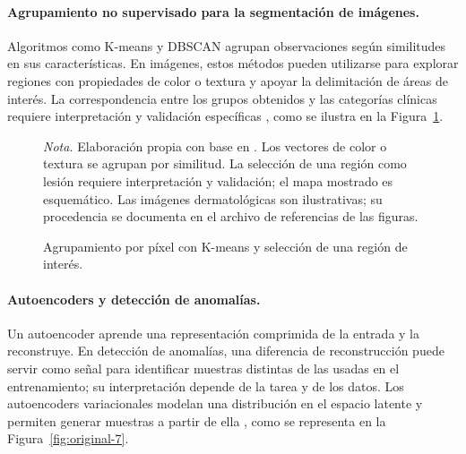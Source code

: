 \paragraph{Agrupamiento no supervisado para la segmentación de imágenes.} Algoritmos como K-means y DBSCAN agrupan observaciones según similitudes en sus características. En imágenes, estos métodos pueden utilizarse para explorar regiones con propiedades de color o textura y apoyar la delimitación de áreas de interés. La correspondencia entre los grupos obtenidos y las categorías clínicas requiere interpretación y validación específicas \parencite{rehman2024cadskin}, como se ilustra en la Figura~\ref{fig:original-6}.

\begin{figure}[!htbp]
\caption{Agrupamiento por píxel con K-means y selección de una región de interés.}
\label{fig:original-6}
\centering

\par\smallskip
\begingroup\footnotesize\singlespacing\raggedright
\textit{Nota.} Elaboración propia con base en \parencite{bishop2006patternrecognition}. Los vectores de color o textura se agrupan por similitud. La selección de una región como lesión requiere interpretación y validación; el mapa mostrado es esquemático. Las imágenes dermatológicas son ilustrativas; su procedencia se documenta en el archivo de referencias de las figuras.
\par\endgroup
\end{figure}






\paragraph{Autoencoders y detección de anomalías.} Un autoencoder aprende una representación comprimida de la entrada y la reconstruye. En detección de anomalías, una diferencia de reconstrucción puede servir como señal para identificar muestras distintas de las usadas en el entrenamiento; su interpretación depende de la tarea y de los datos. Los autoencoders variacionales modelan una distribución en el espacio latente y permiten generar muestras a partir de ella \parencite{kingma2014vae}, como se representa en la Figura~\ref{fig:original-7}.

